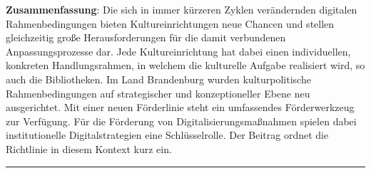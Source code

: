 \textbf{Zusammenfassung}: Die sich in immer kürzeren Zyklen verändernden
digitalen Rahmenbedingungen bieten Kultureinrichtungen neue Chancen und
stellen gleichzeitig große Herausforderungen für die damit verbundenen
Anpassungsprozesse dar. Jede Kultureinrichtung hat dabei einen
individuellen, konkreten Handlungsrahmen, in welchem die kulturelle
Aufgabe realisiert wird, so auch die Bibliotheken. Im Land Brandenburg
wurden kulturpolitische Rahmenbedingungen auf strategischer und
konzeptioneller Ebene neu ausgerichtet. Mit einer neuen Förderlinie
steht ein umfassendes Förderwerkzeug zur Verfügung. Für die Förderung
von Digitalisierungsmaßnahmen spielen dabei institutionelle
Digitalstrategien eine Schlüsselrolle. Der Beitrag ordnet die Richtlinie
in diesem Kontext kurz ein.

\begin{center}\rule{0.5\linewidth}{0.5pt}\end{center}
